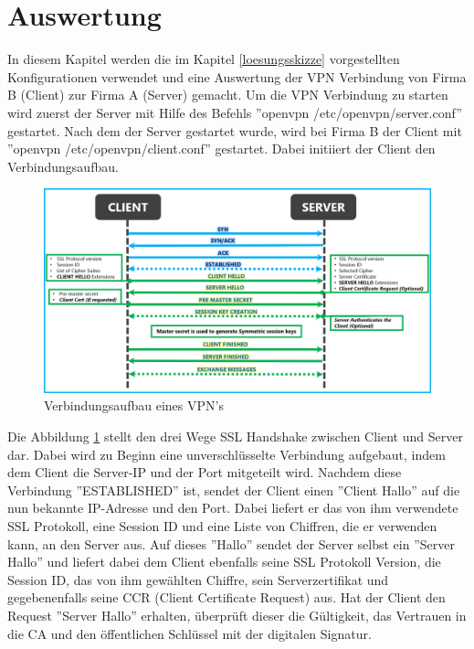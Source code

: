 \section{Auswertung}
In diesem Kapitel werden die im Kapitel \ref{loesungsskizze} vorgestellten Konfigurationen verwendet und eine Auswertung der VPN Verbindung von Firma B (Client) zur Firma A (Server) gemacht.\newline
Um die VPN Verbindung zu starten wird zuerst der Server mit Hilfe des Befehls ''openvpn /etc/openvpn/server.conf'' gestartet. Nach dem der Server gestartet wurde, wird bei Firma B der Client mit ''openvpn /etc/openvpn/client.conf'' gestartet. Dabei initiiert der Client den Verbindungsaufbau. 
\begin{figure}[h]
	\includegraphics[width=\textwidth]{pictures/vpnVerbindungsaufbau.png}
	\caption{Verbindungsaufbau eines VPN's \cite{vanRijn2018May}}
	\label{fig:SSlhand}
\end{figure}
Die Abbildung \ref{fig:SSlhand} stellt den drei Wege SSL Handshake zwischen Client und Server dar. Dabei wird zu Beginn eine unverschlüsselte Verbindung aufgebaut, indem dem Client die Server-IP und der Port mitgeteilt wird. Nachdem diese Verbindung ''ESTABLISHED'' ist, sendet der Client einen ''Client Hallo'' auf die nun bekannte IP-Adresse und den Port. Dabei liefert er das von ihm verwendete SSL Protokoll, eine Session ID und eine Liste von Chiffren, die er verwenden kann, an den Server aus. Auf dieses ''Hallo'' sendet der Server selbst ein ''Server Hallo'' und liefert dabei dem Client ebenfalls seine SSL Protokoll Version, die Session ID, das von ihm gewählten Chiffre, sein Serverzertifikat und gegebenenfalls seine CCR (Client Certificate Request) aus. Hat der Client den Request ''Server Hallo'' erhalten, überprüft dieser die Gültigkeit, das Vertrauen in die CA und den öffentlichen Schlüssel mit der digitalen Signatur. 

